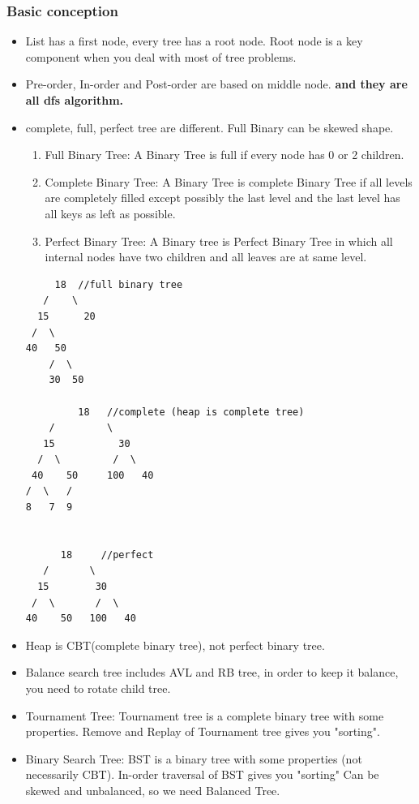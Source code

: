 \documentclass[a4paper,11pt,twoside]{book}
\begin{document}
\subsubsection{Basic conception}
\begin{itemize}
\item List has a first node, every tree has a root node. Root node is a key component when you deal with most of tree problems.  

\item Pre-order, In-order and Post-order are based on middle node. \textbf{and they are all dfs algorithm.}

\item complete, full, perfect tree are different. Full Binary can be skewed shape. 
\begin{enumerate}
	\item Full Binary Tree: A Binary Tree is full if every node has 0 or 2 children. 
	
	
	\item Complete Binary Tree: A Binary Tree is complete Binary Tree if all levels are completely filled except possibly the last level and the last level has all keys as left as possible.
	
	\item Perfect Binary Tree: A Binary tree is Perfect Binary Tree in which all internal nodes have two children and all leaves are at same level.
\end{enumerate}
	
\begin{verbatim}
     18  //full binary tree
   /    \   
  15      20    
 /  \       
40   50   
	/  \
	30  50
	
         18   //complete (heap is complete tree)
    /         \  
   15           30  
  /  \         /  \
 40    50     100   40
/  \   /
8   7  9 
	
	
      18     //perfect 
   /       \  
  15        30  
 /  \       /  \
40    50   100   40
\end{verbatim}


\item Heap is CBT(complete binary tree), not perfect binary tree. 

\item Balance search tree includes AVL and RB tree, in order to keep it balance, you need to rotate child tree. 

\item Tournament Tree: Tournament tree is a complete binary tree with some properties. Remove and  Replay of Tournament tree gives you "sorting". 

\item Binary Search Tree: BST is a binary tree with some properties (not necessarily CBT). In-order traversal of BST gives you "sorting" Can be skewed and unbalanced, so we need Balanced Tree.

\end{itemize}
\end{document}
